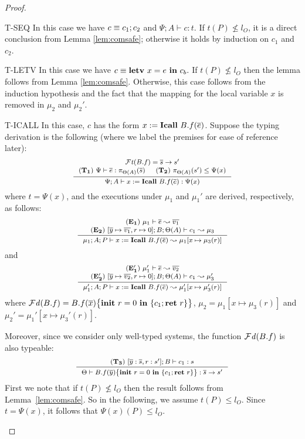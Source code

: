 {{{\begin{proof}
\begin{ProofEnumDesc}
\item[T-SEQ] In this case we have
  $c\equiv{c_1};{c_2}$ and $\Psi;A\vdash c:t$. If $t(P)\not\leq l_{O}$, it is a direct conclusion from Lemma \ref{lem:comsafe}; otherwise it holds by induction on $c_1$ and $c_2$.

\item[T-LETV]
  In this case we have $c\equiv{\textbf{letv}~ {x} = {e} ~\textbf{in}~ {c_b}}.$
  If $t(P) \nleq l_O$ then the lemma follows from Lemma \ref{lem:comsafe}.
  Otherwise, this case follows from the induction hypothesis and the fact
  that the mapping for the local variable $x$ is removed
  in $\mu_2$ and $\mu_2'.$
\item[T-ICALL]
In this case, $c$ has the form
${x}:=\textbf{Icall}~{B.f}({\overline{e}})$. Suppose the typing
derivation is the following (where we label the premises
for ease of reference later):
$$\myeqsize
\inference
{
\FT(B.f) = \overline{s} \rightarrow s' \\
(\mathbf{T_1}) ~ \Psi \vdash \overline{e} : \app{\overline{s}}{\Theta(A)} &
(\mathbf{T_2}) ~ \app{s'}{\Theta(A)} \leq \Psi(x)}
{\Psi; A \vdash \lcCALL{x}{B.f}{\overline{e}} :
 \Psi(x)  }
$$
where $t = \Psi(x)$,
and the executions under $\mu_1$ and $\mu_1'$ are
derived, respectively, as follows:
$$\myeqsize
\inference{
(\mathbf{E_1}) ~ \mu_1\vdash\overline{e} \leadsto \overline{v_1} \\
(\mathbf{E_2}) ~ [\overline{y} \mapsto \overline{v_1}, r \mapsto 0] ; B;
  \Theta(A) \vdash c_1 \leadsto \mu_3
}
{\mu_1; A; P \vdash \lcCALL{x}{B.f}{\overline{e}} \leadsto
              \mu_1 [x \mapsto \mu_3(r) ]}
$$
and
$$\myeqsize
\inference{
(\mathbf{E_1'}) ~ \mu_1'\vdash\overline{e} \leadsto \overline{v_2}
\\
(\mathbf{E_2'}) ~ [\overline{y} \mapsto \overline{v_2}, r \mapsto 0] ; B;
\Theta(A) \vdash c_1 \leadsto \mu_3'}
{\mu_1';A;P \vdash \lcCALL{x}{B.f}{\overline{e}} \leadsto
              \mu_1' [x \mapsto \mu_3'(r) ]}
$$
where
$\mathcal{F}\mathit{d}(B.f) = {B.f}(\overline{x})\big\{{{\textbf{init}~ {r}=0 ~\textbf{in}~\{{c_1};\textbf{ret}~{r}\}}}\big\}$,
$\mu_2 = \mu_1[x \mapsto \mu_3(r)]$
and $\mu_2' = \mu_1'[x \mapsto \mu_3'(r)].$

Moreover, since we consider only well-typed systems,
the function $\mathcal{F}\mathit{d}(B.f)$ is also typeable:
$$\myeqsize
\inference
    {
      (\mathbf{T_3}) ~ [\overline{y}:\overline{s}, r : s']; B\vdash c_1 : s
    }
    {
      \Theta \vdash \lpFUN{B.f}{\overline{y}}{c_1} :
      \overline{s}\rightarrow s'
    }
$$
First we note that if $t(P) \nleq l_O$ then the result
follows from Lemma~\ref{lem:comsafe}.
So in the following, we assume $t(P) \leq l_O$.
Since $t = \Psi(x)$, it follows that
$\Psi(x)(P) \leq l_O.$


\end{ProofEnumDesc}
\end{proof}}}}
